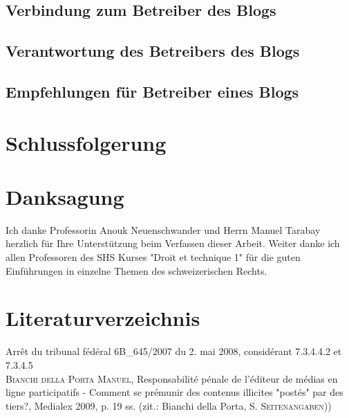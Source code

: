 \documentclass[a4paper, 11pt] {article}
\begin{document}


\subsection{Verbindung zum Betreiber des Blogs}



\subsection{Verantwortung des Betreibers des Blogs}


\subsection{Empfehlungen für Betreiber eines Blogs}



\newpage

\section{Schlussfolgerung}



\newpage
{}
{}
\section*{Danksagung}
\noindent
Ich danke Professorin Anouk Neuenschwander und Herrn Manuel Tarabay herzlich für Ihre Unterstützung beim Verfassen dieser Arbeit. Weiter danke ich allen Professoren des SHS Kurses "Droit et technique 1" für die guten Einführungen in einzelne Themen des schweizerischen Rechts.

\newpage
{}
{}
\section*{Literaturverzeichnis}

\noindent
Arrêt du tribunal fédéral 6B\_645/2007 du 2. mai 2008, considérant 7.3.4.4.2 et 7.3.4.5 \\

\noindent
\textsc{Bianchi della Porta Manuel}, Responsabilité pénale de l'éditeur de médias en ligne participatifs - Comment se prémunir des contenus illicites "postés" par des tiers?, Medialex 2009, p. 19 ss. (zit.: Bianchi della Porta, S. \textsc{Seitenangaben})) \\
\end{document}
